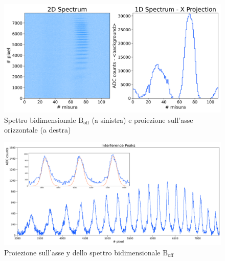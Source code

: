 \documentclass[twocolumn,10pt]{asme2ej}
\begin{document}
\begin{figure}
    \centering
    \includegraphics[width=\linewidth]{../Plots/Boff_2d_spectrum.png}
    \caption{Spettro bidimensionale $\text{B}_{\text{off}}$ (a sinistra) e proiezione sull'asse orizzontale (a destra)}
    \label{i:spettro2d_Boff}
\end{figure}



 \begin{figure}
     \centering
     \includegraphics[width=\textwidth]{../Plots/Boff_Y_proj.png}
    \caption{Proiezione sull'asse y dello spettro bidimensionale $\text{B}_{\text{off}}$}
     \label{i:spettro2d_Boff_ProjY}
 \end{figure}
\end{document}
